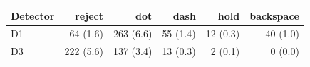 \begin{tabular}{lrrrrr}
\toprule
Detector & reject & dot & dash & hold & backspace \\
\midrule
D1 & 64 (1.6) & 263 (6.6) & 55 (1.4) & 12 (0.3) & 40 (1.0) \\
D3 & 222 (5.6) & 137 (3.4) & 13 (0.3) & 2 (0.1) & 0 (0.0) \\
\bottomrule
\end{tabular}
